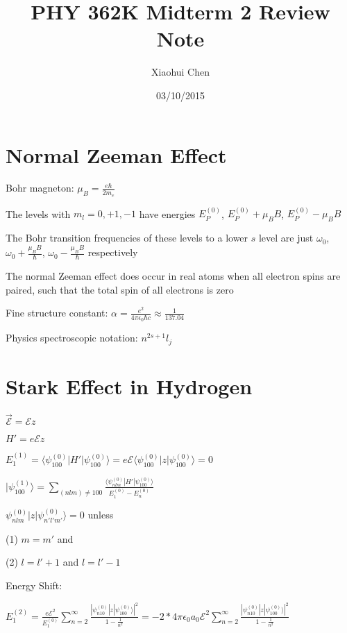 \documentclass[12pt]{article}
\author{Xiaohui Chen}
\title{PHY 362K Midterm 2 Review Note}
\date{03/10/2015}
\begin{document}
\maketitle

\begin{spacing}{2.0}

\section{Normal Zeeman Effect}

Bohr magneton: $\mu_B = \frac{e\hbar}{2m_e}$

The levels with $m_l=0,+1,-1$ have energies $E_P^{(0)}$, $E_P^{(0)}+ \mu_B B$, $E_P^{(0)}- \mu_B B$

The Bohr transition frequencies of these levels to a lower $s$ level are just $\omega_0$, $\omega_0+ \frac{\mu_B B}{\hbar}$, $\omega_0- \frac{\mu_B B}{\hbar}$ respectively

The normal Zeeman effect does occur in real atoms when all electron spins are paired, such that the total spin of all electrons is zero

Fine structure constant: $\alpha= \frac{e^2}{4\pi \epsilon_0 \hbar c} \approx \frac{1}{137.04}$

Physics spectroscopic notation: $n^{2s+1}l_j$

\section{Stark Effect in Hydrogen}

$\vec{\mathcal{E}}= \mathcal{E}z$

$H'=e\mathcal{E}z$

$E_1^{(1)}= \langle \psi_{100}^{(0)}| H'| \psi_{100}^{(0)}\rangle= e\mathcal{E}\langle \psi_{100}^{(0)}|z| \psi_{100}^{(0)}\rangle = 0$

$|\psi_{100}^{(1)} \rangle= \sum\limits_{(nlm)\ne 100} \frac{\langle \psi_{nlm}^{(0)}| H'| \psi_{100}^{(0)}\rangle}{E_1^{(0)}-E_n^{(0)}}$

$\psi_{nlm}^{(0)}|z| \psi_{n'l'm'}^{(0)}\rangle = 0$ unless

(1) $m=m'$ and 

(2) $l=l'+1$ and $l=l'-1$

Energy Shift:

$E_1^{(2)}= \frac{e\mathcal{E}^2}{E_1^{(0)}} \sum\limits_{n=2}^{\infty} \frac{|\psi_{n10}^{(0)}|z| \psi_{100}^{(0)}\rangle|^2}{1-\frac{1}{n^2}}= -2*4\pi\epsilon_0 a_0 \mathcal{E}^2 \sum\limits_{n=2}^{\infty} \frac{|\psi_{n10}^{(0)}|z| \psi_{100}^{(0)}\rangle|^2}{1-\frac{1}{n^2}}$


\end{spacing}
\end{document}
